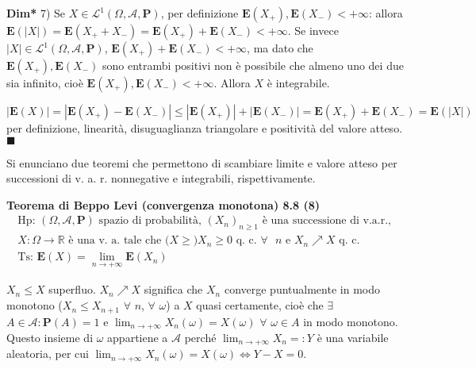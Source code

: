 \documentclass{article}
\begin{document}
\textbf{Dim*} 7) Se $X\in \mathcal{L}^{1}\left( \Omega ,\mathcal{A},\mathbf{P%
}\right) $, per definizione $\mathbf{E}\left( X_{+}\right) ,\mathbf{E}\left(
X_{-}\right) <+\infty $: allora $\mathbf{E}\left( \left\vert X\right\vert
\right) =\mathbf{E}\left( X_{+}+X_{-}\right) =\mathbf{E}\left( X_{+}\right) +%
\mathbf{E}\left( X_{-}\right) <+\infty $. Se invece $\left\vert X\right\vert
\in \mathcal{L}^{1}\left( \Omega ,\mathcal{A},\mathbf{P}\right) $, $\mathbf{E%
}\left( X_{+}\right) +\mathbf{E}\left( X_{-}\right) <+\infty $, ma dato che $%
\mathbf{E}\left( X_{+}\right) ,\mathbf{E}\left( X_{-}\right) $ sono entrambi
positivi non \`{e} possibile che almeno uno dei due sia infinito, cio\`{e} $%
\mathbf{E}\left( X_{+}\right) ,\mathbf{E}\left( X_{-}\right) <+\infty $.
Allora $X$ \`{e} integrabile.

$\left\vert \mathbf{E}\left( X\right) \right\vert =\left\vert \mathbf{E}%
\left( X_{+}\right) -\mathbf{E}\left( X_{-}\right) \right\vert \leq
\left\vert \mathbf{E}\left( X_{+}\right) \right\vert +\left\vert \mathbf{E}%
\left( X_{-}\right) \right\vert =\mathbf{E}\left( X_{+}\right) +\mathbf{E}%
\left( X_{-}\right) =\mathbf{E}\left( \left\vert X\right\vert \right) $ per
definizione, linearit\`{a}, disuguaglianza triangolare e positivit\`{a} del
valore atteso. $\blacksquare $

Si enunciano due teoremi che permettono di scambiare limite e valore atteso
per successioni di v. a. r. nonnegative e integrabili, rispettivamente.

\textbf{Teorema di Beppo Levi (convergenza monotona) 8.8 (8)}%
\begin{gather*}
\text{Hp: }\left( \Omega ,\mathcal{A},\mathbf{P}\right) \text{ spazio di
probabilit\`{a}, }\left( X_{n}\right) _{n\geq 1}\text{ \`{e} una successione
di v.a.r., } \\
X:\Omega \rightarrow 
\mathbb{R}
\text{ \`{e} una v. a. tale che (}X\geq \text{)}X_{n}\geq 0\text{ q. c. }%
\forall \text{ }n\text{ e }X_{n}\nearrow X\text{ q. c.} \\
\text{Ts: }\mathbf{E}\left( X\right) =\lim_{n\rightarrow +\infty }\mathbf{E}%
\left( X_{n}\right)
\end{gather*}

$X_{n}\leq X$ superfluo. $X_{n}\nearrow X$ significa che $X_{n}$ converge
puntualmente in modo monotono ($X_{n}\leq X_{n+1}$ $\forall $ $n$, $\forall $
$\omega $) a $X$ quasi certamente, cio\`{e} che $\exists $ $A\in \mathcal{A}:%
\mathbf{P}\left( A\right) =1$ e $\lim_{n\rightarrow +\infty }X_{n}\left(
\omega \right) =X\left( \omega \right) $ $\forall $ $\omega \in A$ in modo
monotono. Questo insieme di $\omega $ appartiene a $\mathcal{A}$ perch\'{e} $%
\lim_{n\rightarrow +\infty }X_{n}=:Y$ \`{e} una variabile aleatoria, per cui 
$\lim_{n\rightarrow +\infty }X_{n}\left( \omega \right) =X\left( \omega
\right) \Longleftrightarrow Y-X=0$.
\end{document}
